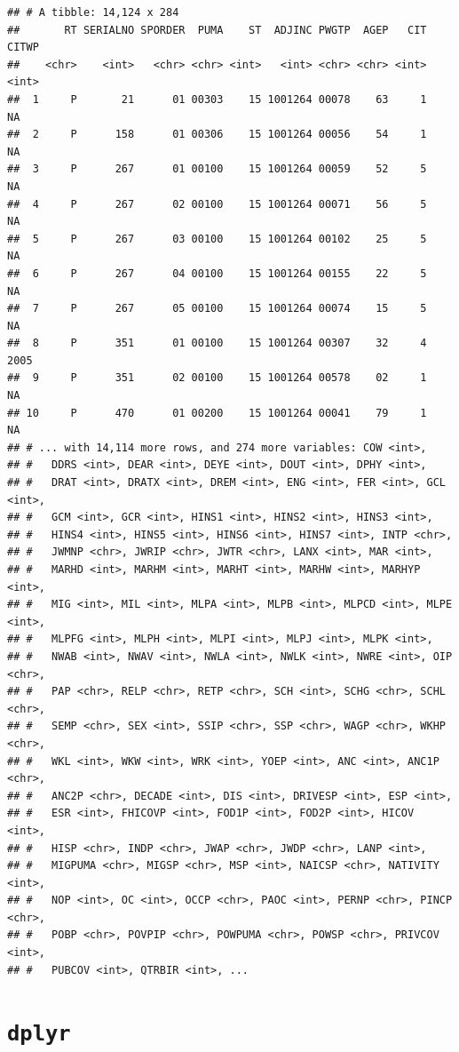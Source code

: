 \documentclass[]{book}
\theoremstyle{definition}
\theoremstyle{definition}
\theoremstyle{remark}
\begin{document}
\begin{verbatim}
## # A tibble: 14,124 x 284
##       RT SERIALNO SPORDER  PUMA    ST  ADJINC PWGTP  AGEP   CIT CITWP
##    <chr>    <int>   <chr> <chr> <int>   <int> <chr> <chr> <int> <int>
##  1     P       21      01 00303    15 1001264 00078    63     1    NA
##  2     P      158      01 00306    15 1001264 00056    54     1    NA
##  3     P      267      01 00100    15 1001264 00059    52     5    NA
##  4     P      267      02 00100    15 1001264 00071    56     5    NA
##  5     P      267      03 00100    15 1001264 00102    25     5    NA
##  6     P      267      04 00100    15 1001264 00155    22     5    NA
##  7     P      267      05 00100    15 1001264 00074    15     5    NA
##  8     P      351      01 00100    15 1001264 00307    32     4  2005
##  9     P      351      02 00100    15 1001264 00578    02     1    NA
## 10     P      470      01 00200    15 1001264 00041    79     1    NA
## # ... with 14,114 more rows, and 274 more variables: COW <int>,
## #   DDRS <int>, DEAR <int>, DEYE <int>, DOUT <int>, DPHY <int>,
## #   DRAT <int>, DRATX <int>, DREM <int>, ENG <int>, FER <int>, GCL <int>,
## #   GCM <int>, GCR <int>, HINS1 <int>, HINS2 <int>, HINS3 <int>,
## #   HINS4 <int>, HINS5 <int>, HINS6 <int>, HINS7 <int>, INTP <chr>,
## #   JWMNP <chr>, JWRIP <chr>, JWTR <chr>, LANX <int>, MAR <int>,
## #   MARHD <int>, MARHM <int>, MARHT <int>, MARHW <int>, MARHYP <int>,
## #   MIG <int>, MIL <int>, MLPA <int>, MLPB <int>, MLPCD <int>, MLPE <int>,
## #   MLPFG <int>, MLPH <int>, MLPI <int>, MLPJ <int>, MLPK <int>,
## #   NWAB <int>, NWAV <int>, NWLA <int>, NWLK <int>, NWRE <int>, OIP <chr>,
## #   PAP <chr>, RELP <chr>, RETP <chr>, SCH <int>, SCHG <chr>, SCHL <chr>,
## #   SEMP <chr>, SEX <int>, SSIP <chr>, SSP <chr>, WAGP <chr>, WKHP <chr>,
## #   WKL <int>, WKW <int>, WRK <int>, YOEP <int>, ANC <int>, ANC1P <chr>,
## #   ANC2P <chr>, DECADE <int>, DIS <int>, DRIVESP <int>, ESP <int>,
## #   ESR <int>, FHICOVP <int>, FOD1P <int>, FOD2P <int>, HICOV <int>,
## #   HISP <chr>, INDP <chr>, JWAP <chr>, JWDP <chr>, LANP <int>,
## #   MIGPUMA <chr>, MIGSP <chr>, MSP <int>, NAICSP <chr>, NATIVITY <int>,
## #   NOP <int>, OC <int>, OCCP <chr>, PAOC <int>, PERNP <chr>, PINCP <chr>,
## #   POBP <chr>, POVPIP <chr>, POWPUMA <chr>, POWSP <chr>, PRIVCOV <int>,
## #   PUBCOV <int>, QTRBIR <int>, ...
\end{verbatim}

\section{\texorpdfstring{\texttt{dplyr}}{dplyr}}\label{dplyr}
\end{document}
